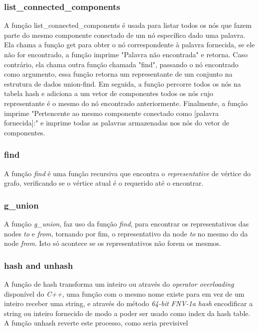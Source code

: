 \documentclass[a4paper,11pt]{article}
\begin{document}
    \subsubsection{list\_connected\_components}
    A função list\_connected\_components é usada para listar todos os nós que fazem parte do mesmo componente conectado de um nó específico dado uma palavra. Ela chama a função get para obter o nó correspondente à palavra fornecida, se ele não for encontrado, a função imprime "Palavra não encontrada" e retorna. Caso contrário, ela chama outra função chamada "find", passando o nó encontrado como argumento, essa função retorna um representante de um conjunto na estrutura de dados union-find. Em seguida, a função percorre todos os nós na tabela hash e adiciona a um vetor de componentes todos os nós cujo representante é o mesmo do nó encontrado anteriormente. Finalmente, a função imprime "Pertencente ao mesmo componente conectado como [palavra fornecida]:" e imprime todas as palavras armazenadas nos nós do vetor de componentes.
    
    \subsubsection{find}
    A função \emph{find} é uma função recursiva que encontra o \emph{representative}  de vértice do grafo, verificando se o vértice atual é o requerido até o encontrar.
    
    \subsubsection{g\_union}
    A função \emph{g\_union}, faz uso da função \emph{find}, para encontrar os representativos das nodes \emph{to} e \emph{from}, tornando por fim, o representativo da node \emph{to} no mesmo do da node \emph{from}. Isto só acontece se os representativos não forem os mesmos.
    
    \subsubsection{hash and unhash}
    A função de hash transforma um inteiro ou através do \emph{operator overloading} disponível do \emph{C++}, uma função com o mesmo nome existe para em vez de um inteiro receber uma string, e através do método \emph{64-bit FNV-1a hash} encodificar a string ou inteiro fornecido de modo a poder ser usado como index da hash table. A função unhash reverte este processo, como seria previsivel
\end{document}

